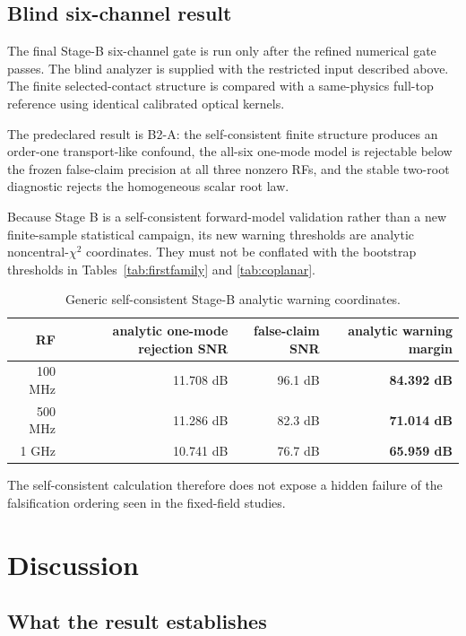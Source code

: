 \documentclass[11pt]{article}
\begin{document}
\subsection{Blind six-channel result}

The final Stage-B six-channel gate is run only after the refined numerical gate passes. The blind analyzer is supplied with the restricted input described above. The finite selected-contact structure is compared with a same-physics full-top reference using identical calibrated optical kernels.

The predeclared result is B2-A: the self-consistent finite structure produces an order-one transport-like confound, the all-six one-mode model is rejectable below the frozen false-claim precision at all three nonzero RFs, and the stable two-root diagnostic rejects the homogeneous scalar root law.

Because Stage B is a self-consistent forward-model validation rather than a new finite-sample statistical campaign, its new warning thresholds are analytic noncentral-$\chi^2$ coordinates. They must not be conflated with the bootstrap thresholds in Tables~\ref{tab:firstfamily} and \ref{tab:coplanar}.

\begin{table}[H]
\centering
\caption{Generic self-consistent Stage-B analytic warning coordinates.}
\label{tab:stagebsnr}
\begin{tabular}{rrrr}
\toprule
RF & analytic one-mode rejection SNR & false-claim SNR & analytic warning margin\\
\midrule
100 MHz & 11.708 dB & 96.1 dB & \textbf{84.392 dB}\\
500 MHz & 11.286 dB & 82.3 dB & \textbf{71.014 dB}\\
1 GHz & 10.741 dB & 76.7 dB & \textbf{65.959 dB}\\
\bottomrule
\end{tabular}
\end{table}

The self-consistent calculation therefore does not expose a hidden failure of the falsification ordering seen in the fixed-field studies.

\section{Discussion}

\subsection{What the result establishes}
\end{document}
